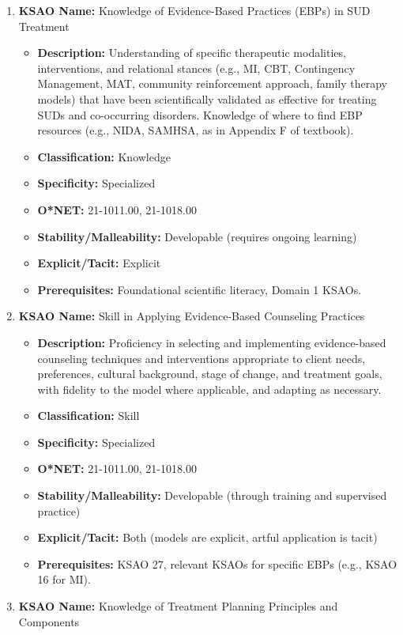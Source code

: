 \documentclass[
  letterpaper,
  DIV=11,
  numbers=noendperiod]{scrartcl}
\providecommand{\tightlist}{%
  \setlength{\itemsep}{0pt}\setlength{\parskip}{0pt}}
\begin{document}
\begin{enumerate}
\def\labelenumi{\arabic{enumi}.}
\setcounter{enumi}{26}
\tightlist
\item
  \textbf{KSAO Name:} Knowledge of Evidence-Based Practices (EBPs) in
  SUD Treatment

  \begin{itemize}
  \tightlist
  \item
    \textbf{Description:} Understanding of specific therapeutic
    modalities, interventions, and relational stances (e.g., MI, CBT,
    Contingency Management, MAT, community reinforcement approach,
    family therapy models) that have been scientifically validated as
    effective for treating SUDs and co-occurring disorders. Knowledge of
    where to find EBP resources (e.g., NIDA, SAMHSA, as in Appendix F of
    textbook).
  \item
    \textbf{Classification:} Knowledge
  \item
    \textbf{Specificity:} Specialized
  \item
    \textbf{O*NET:} 21-1011.00, 21-1018.00
  \item
    \textbf{Stability/Malleability:} Developable (requires ongoing
    learning)
  \item
    \textbf{Explicit/Tacit:} Explicit
  \item
    \textbf{Prerequisites:} Foundational scientific literacy, Domain 1
    KSAOs.
  \end{itemize}
\item
  \textbf{KSAO Name:} Skill in Applying Evidence-Based Counseling
  Practices

  \begin{itemize}
  \tightlist
  \item
    \textbf{Description:} Proficiency in selecting and implementing
    evidence-based counseling techniques and interventions appropriate
    to client needs, preferences, cultural background, stage of change,
    and treatment goals, with fidelity to the model where applicable,
    and adapting as necessary.
  \item
    \textbf{Classification:} Skill
  \item
    \textbf{Specificity:} Specialized
  \item
    \textbf{O*NET:} 21-1011.00, 21-1018.00
  \item
    \textbf{Stability/Malleability:} Developable (through training and
    supervised practice)
  \item
    \textbf{Explicit/Tacit:} Both (models are explicit, artful
    application is tacit)
  \item
    \textbf{Prerequisites:} KSAO 27, relevant KSAOs for specific EBPs
    (e.g., KSAO 16 for MI).
  \end{itemize}
\item
  \textbf{KSAO Name:} Knowledge of Treatment Planning Principles and
  Components


\end{enumerate}
\end{document}
